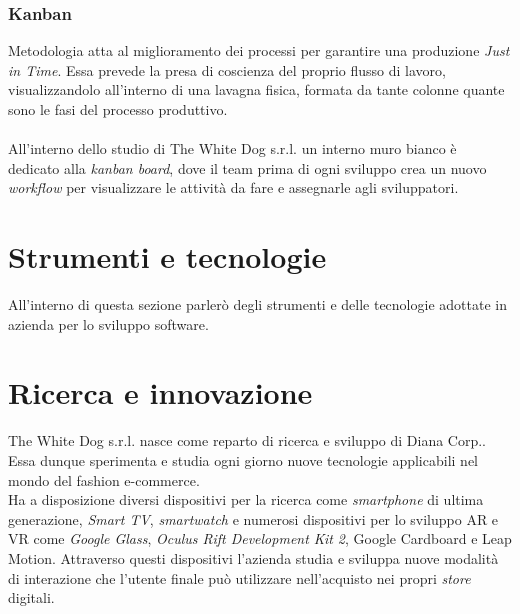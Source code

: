 \subsubsection{Kanban}

Metodologia atta al miglioramento dei processi per garantire una produzione \textit{Just in Time}. Essa prevede la presa di coscienza del proprio flusso di lavoro, visualizzandolo all'interno di una lavagna fisica, formata da tante colonne quante sono le fasi del processo produttivo. \\ \\
All'interno dello studio di The White Dog s.r.l. un interno muro bianco è dedicato alla \textit{kanban board}, dove il team prima di ogni sviluppo crea un nuovo \textit{workflow} per visualizzare le attività da fare e assegnarle agli sviluppatori.

\section{Strumenti e tecnologie}

All'interno di questa sezione parlerò degli strumenti e delle tecnologie adottate in azienda per lo sviluppo software.

\section{Ricerca e innovazione}

The White Dog s.r.l. nasce come reparto di ricerca e sviluppo di Diana Corp.. Essa dunque sperimenta e studia ogni giorno nuove tecnologie applicabili nel mondo del fashion e-commerce. \\
Ha a disposizione diversi dispositivi per la ricerca come \textit{smartphone} di ultima generazione, \textit{Smart TV}, \textit{smartwatch} e numerosi dispositivi per lo sviluppo AR e VR come \textit{Google Glass}, \textit{Oculus Rift Development Kit 2}, Google Cardboard e Leap Motion. Attraverso questi dispositivi l'azienda studia e sviluppa nuove modalità di interazione che l'utente finale può utilizzare nell'acquisto nei propri \textit{store} digitali.